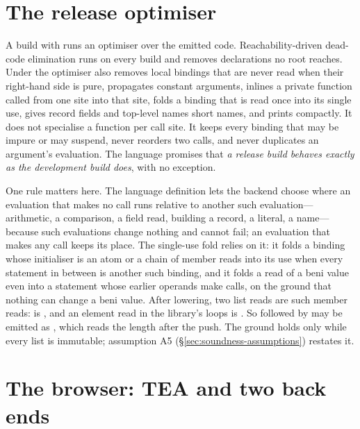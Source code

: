 \section{The release optimiser}
\label{sec:bg-release}

A build with  runs an optimiser over the emitted code. Reachability-driven dead-code
elimination runs on every build and removes declarations no root reaches. Under  the
optimiser also removes local bindings that are never read when their right-hand side is pure,
propagates constant arguments, inlines a private function called from one site into that site, folds
a binding that is read once into its single use, gives record fields and top-level names short names,
and prints compactly. It does not specialise a function per call site. It keeps every binding that
may be impure or may suspend, never reorders two calls, and never duplicates an argument's
evaluation. The language promises that \emph{a release build behaves exactly as the development build
does}, with no exception.

One rule matters here. The language definition lets the backend choose where an evaluation that
makes no call runs relative to another such evaluation---arithmetic, a comparison, a field read,
building a record, a literal, a name---because such evaluations change nothing and cannot fail; an
evaluation that makes any call keeps its place. The single-use fold relies on it: it folds a binding
whose initialiser is an atom or a chain of member reads into its use when every statement in between
is another such binding, and it folds a read of a beni value even into a statement whose earlier
operands make calls, on the ground that nothing can change a beni value. After lowering, two list
reads are such member reads:  is , and an element read in the
library's loops is . So  followed by 
may be emitted as , which reads the length after the push. The ground
holds only while every list is immutable; assumption A5 (\S\ref{sec:soundness-assumptions})
restates it.

\section{The browser: TEA and two back ends}
\label{sec:bg-browser}

